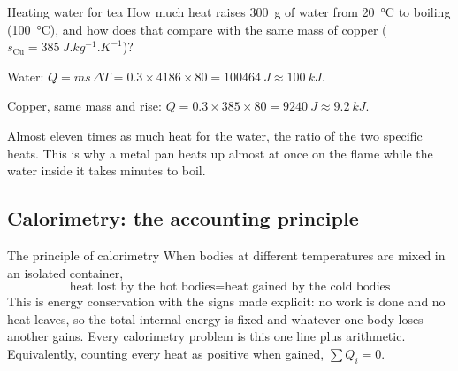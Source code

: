 
\begin{exbox}{Heating water for tea}\label{ex:tea}
How much heat raises \SI{300}{g} of water from \SI{20}{\celsius} to boiling (\SI{100}{\celsius}),
and how does that compare with the same mass of copper ($s_{\text{Cu}} = \SI{385}{J.kg^{-1}.K^{-1}}$)?

 Water: $Q = ms\,\Delta T = 0.3 \times 4186 \times 80 = \SI{100464}{J} \approx \SI{100}{kJ}$.

 Copper, same mass and rise:
$Q = 0.3 \times 385 \times 80 = \SI{9240}{J} \approx \SI{9.2}{kJ}$.

\medskip
Almost eleven times as much heat for the water, the ratio of the two specific heats. This is why a metal
pan heats up almost at once on the flame while the water inside it takes minutes to boil.
\end{exbox}

\subsection{Calorimetry: the accounting principle}

\begin{keybox}{The principle of calorimetry}
When bodies at different temperatures are mixed in an isolated container,
\[
\boxed{\;\text{heat lost by the hot bodies} = \text{heat gained by the cold bodies}\;}
\]
This is energy conservation with the signs made explicit: no work is done and no heat leaves, so the
total internal energy is fixed and whatever one body loses another gains. Every calorimetry problem is
this one line plus arithmetic. Equivalently, counting every heat as positive when gained,
$\sum Q_i=0$.
\end{keybox}

